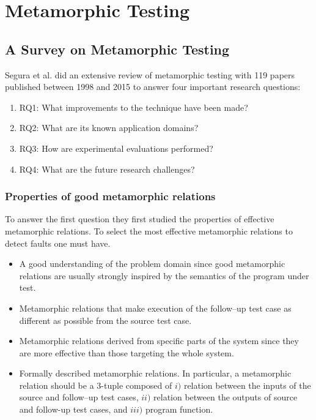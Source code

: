 \section{Metamorphic Testing}
	\subsection{A Survey on Metamorphic Testing \cite{Segura2016}}
		Segura et al. did an extensive review of metamorphic testing with 119 papers published between 1998 and 2015 to answer four important research questions:
		\begin{enumerate}
			\item RQ1: What improvements to the technique have been made?
			\item RQ2: What are its known application domains?
			\item RQ3: How are experimental evaluations performed?
			\item RQ4: What are the future research challenges?
		\end{enumerate}

		\subsubsection{Properties of good metamorphic relations}
			To answer the first question they first studied the properties of effective metamorphic relations. To select the most effective metamorphic relations to detect faults one must have.
			\begin{itemize}
				\item A good understanding of the problem domain since good metamorphic relations are usually strongly inspired by the semantics of the program under test.
				\item Metamorphic relations that make execution of the follow–up test case as different as possible from the source test case.
				\item Metamorphic relations derived from specific parts of the system since they are more effective than those targeting the whole system.
				\item Formally described metamorphic relations. In particular, a metamorphic relation should be a 3-tuple composed of $i)$ relation between the inputs of the source and follow–up test cases, $ii)$ relation between the outputs of source and follow-up test cases, and $iii)$ program function.
			\end{itemize}

